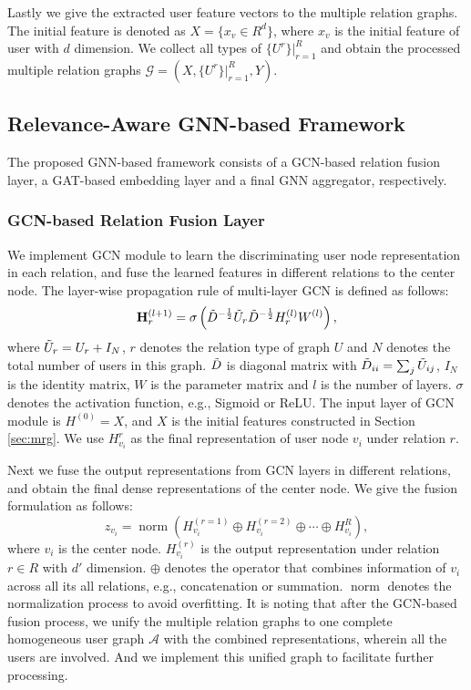 \documentclass[conference]{IEEEtran}
\theoremstyle{definition}
\begin{document}
Lastly we give the extracted user feature vectors to the multiple relation graphs. The initial feature is denoted as $X = \{x_v \in R^d\}$, where $x_v$ is the initial feature of user with $d$ dimension.  We collect all types of $\{U^r\}|^R_{r=1}$ and obtain the processed multiple relation graphs $\mathcal{G} = (X, \{U^r\}|^R_{r=1}, Y)$.



\subsection{Relevance-Aware GNN-based Framework}
The proposed GNN-based framework consists of a GCN-based relation fusion layer, a GAT-based embedding layer and a final GNN aggregator, respectively.
\subsubsection{GCN-based Relation Fusion Layer}
We implement GCN module to learn the discriminating user node representation in each relation, and fuse the learned features in different relations to the center node. The layer-wise propagation rule of multi-layer GCN is defined as follows:
\begin{equation}
\label{equ:gcn}
    \mathbf{H}^{(l+1)}_r = \sigma \left(\Tilde{D}^{-\frac{1}{2}}\Tilde{U}_r\Tilde{D}^{-\frac{1}{2}}H_r^{(l)}W^{(l)} \right),
\end{equation}
where $\Tilde{U}_r = U_r + I_N$, $r$ denotes the relation type of graph $U$ and $N$ denotes the total number of users in this graph. $\Tilde{D}$ is diagonal matrix with $\Tilde{D}_{ii}=\sum_j\Tilde{U}_{ij}$, $I_N$ is the identity matrix, $W$ is the parameter matrix and $l$ is the number of layers. $\sigma$ denotes the activation function, e.g., Sigmoid or ReLU. The input layer of GCN module is $H^{(0)} = X$, and $X$ is the initial features constructed in Section \ref{sec:mrg}. We use $H^r_{v_i}$ as the final representation of user node $v_i$ under relation $r$.

Next we fuse the output representations from GCN layers in different relations, and obtain the final dense representations of the center node.
We give the fusion formulation as follows:
\begin{equation}
\label{equ:fusion}
    z_{v_i} = \operatorname{norm}\left(H^{(r=1)}_{v_i} \oplus H^{(r=2)}_{v_i} \oplus \cdots \oplus H^{R}_{v_i} \right),
\end{equation}
where $v_i$ is the center node. $H^{(r)}_{v_i}$ is the output representation under relation $r \in R$ with $d'$ dimension. $\oplus$ denotes the operator that combines information of $v_i$ across all its all relations, e.g., concatenation or summation. $\operatorname{norm}$ denotes the normalization process to avoid overfitting.
It is noting that after the GCN-based fusion process, we unify the multiple relation graphs to one complete homogeneous user graph $\mathcal{A}$ with the combined representations, wherein all the users are involved. And we implement this unified graph to facilitate further processing.
\end{document}
